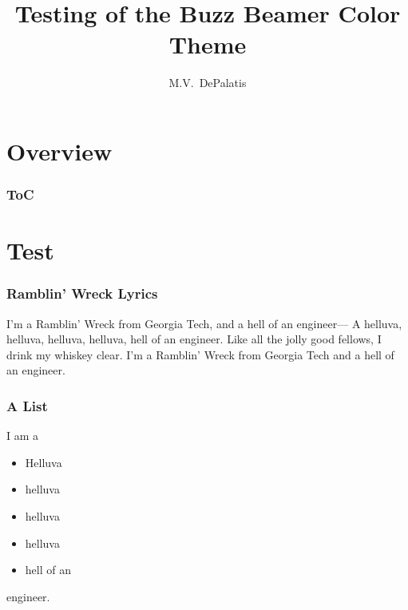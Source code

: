 \documentclass{beamer}
\title{Testing of the Buzz Beamer Color Theme}
\author{M.V.~DePalatis}
\institute[GT]{School of Physics, Georgia Institute of Technology}
\begin{document}
\begin{frame}
  \titlepage
\end{frame}

\section{Overview}
\label{sec:overview}

\begin{frame}
  \frametitle{ToC}
  \tableofcontents
\end{frame}

\section{Test}
\label{sec:test}

\begin{frame}
  \frametitle{Ramblin' Wreck Lyrics}

  I'm a Ramblin' Wreck from Georgia Tech, and a hell of an engineer---
  A helluva, helluva, helluva, helluva, hell of an engineer. Like all
  the jolly good fellows, I drink my whiskey clear. I'm a Ramblin'
  Wreck from Georgia Tech and a hell of an engineer.
\end{frame}

\begin{frame}
  \frametitle{A List}
  I am a
  \begin{itemize}
    \item Helluva
    \item helluva
    \item helluva
    \item helluva
    \item hell of an
  \end{itemize}
engineer.
\end{frame}
  
\end{document}
